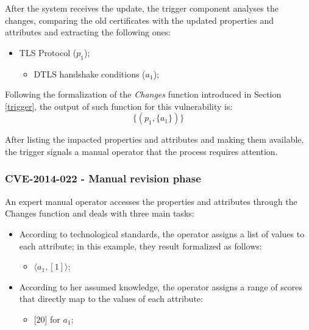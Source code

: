 After the system receives the update, the trigger component analyses the changes, comparing the old certificates with the updated properties and attributes and extracting the following ones:
\begin{itemize}
    \item TLS Protocol (\(p_1\));
    \begin{itemize}
        \item DTLS handshake conditions (\(a_1\));
    \end{itemize}
\end{itemize}

Following the formalization of the \textit{Changes} function introduced in Section \ref{trigger}, the output of such function for this vulnerability is: \[ \{ (p_1, \{a_1\})\}\]

After listing the impacted properties and attributes and making them available, the trigger signals a manual operator that the process requires attention.

\subsubsection{CVE-2014-022 - Manual revision phase}
An expert manual operator accesses the properties and attributes through the Changes function and deals with three main tasks:
\begin{itemize}
    \item According to technological standards, the operator assigns a list of values to each attribute; in this example, they result formalized as follows:
    \begin{itemize}
        \item \(\langle a_1, [1]\rangle\);
    \end{itemize}
    
    \item According to her assumed knowledge, the operator assigns a range of scores that directly map to the values of each attribute:
    \begin{itemize}
        \item {[20]} for \(a_1\);
    \end{itemize}
\end{itemize}



